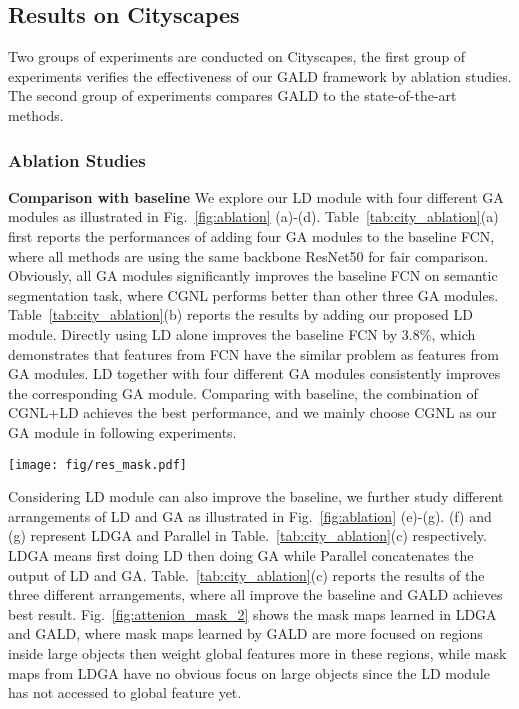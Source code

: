 \documentclass{bmvc2k}
\begin{document}
\subsection{Results on Cityscapes}
Two groups of experiments are conducted on Cityscapes, the first group of experiments verifies the effectiveness of our GALD framework by ablation studies.  The second group of experiments compares GALD to the state-of-the-art methods.




\subsubsection{Ablation Studies }
\label{sec:ablation}
\textbf{Comparison with baseline} 
We explore our LD module with four different GA modules as illustrated in Fig.~\ref{fig:ablation} (a)-(d).
Table~\ref{tab:city_ablation}(a) first reports the performances of adding four GA modules to the baseline FCN, where all methods are using the same backbone ResNet50 for fair comparison.  Obviously, all GA modules significantly improves the baseline FCN on semantic segmentation task, where CGNL performs better than other three GA modules.
Table~\ref{tab:city_ablation}(b) reports the results by adding our proposed LD module. Directly using LD alone improves the baseline FCN by 3.8\%, which demonstrates that features from FCN have the similar problem as features from GA modules. LD together with four different GA modules consistently improves the corresponding GA module. Comparing with baseline, the combination of CGNL+LD achieves the best performance, and we mainly choose CGNL as our GA module in following experiments.



\begin{figure*}
	\centering
	\texttt{[image: fig/res\_mask.pdf]}
	\caption{
	    Comparison of mask maps learned in different arrangements of GA and LD. The mask maps are calculated by the mean of  along channel dimension.
		Best view in color.}
	\label{fig:attenion_mask_2}
\end{figure*}

 Considering LD module can also improve the baseline, we further study different arrangements of LD and GA as illustrated in Fig.~\ref{fig:ablation} (e)-(g). (f) and (g) represent LDGA and Parallel in Table.~\ref{tab:city_ablation}(c) respectively. LDGA means first doing LD then doing GA while Parallel concatenates the output of LD and GA.
Table.~\ref{tab:city_ablation}(c) reports the results of the three different arrangements, where all improve the baseline and GALD achieves best result. Fig.~\ref{fig:attenion_mask_2} shows the mask maps learned in LDGA and GALD, where mask maps
learned by GALD are more focused on regions inside large objects then weight global features more in these regions, while mask maps from LDGA have no obvious focus on large objects since the LD module has not accessed to global feature yet.
\end{document}

